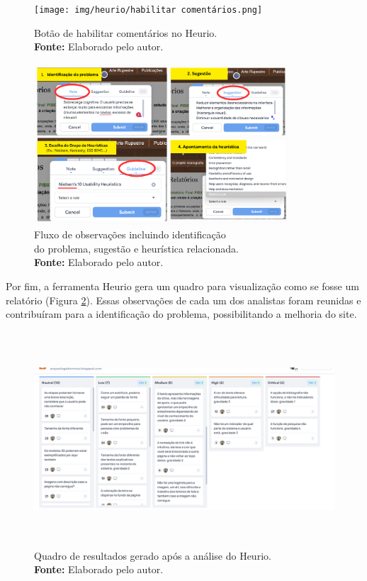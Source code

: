 \begin{figure}[H]
    \centering
    \begin{minipage}[b]{0.48\textwidth}
        \centering
        \texttt{[image: img/heurio/habilitar comentários.png]}
        \caption{Botão de habilitar comentários no Heurio.  \\
            \textbf{Fonte:} Elaborado pelo autor.}
        \label{fig:comentario heurio}
    \end{minipage}
    \hfill
    \begin{minipage}[b]{0.48\textwidth}
        \centering
        \includegraphics[height=6cm, keepaspectratio]{img/heurio/fluxo heurio.png}
        \caption{Fluxo de observações incluindo identificação \\do problema, sugestão e heurística relacionada. \\
            \textbf{Fonte:} Elaborado pelo autor.}
        \label{fig:fluxo heurio}
    \end{minipage}
\end{figure}

Por fim, a ferramenta Heurio gera um quadro para visualização como se fosse um relatório (Figura \ref{fig:quadro resultados}). Essas observações de cada um dos analistas foram reunidas e contribuíram para a identificação do problema, possibilitando a melhoria do site. 
\begin{figure}[H]
    \centering
    \includegraphics[height=8cm, keepaspectratio]{img/heurio/quadro resultados.png}
    \caption{ Quadro de resultados gerado após a análise do Heurio. \\
        \textbf{Fonte:} Elaborado pelo autor.}
    \label{fig:quadro resultados}
\end{figure}


